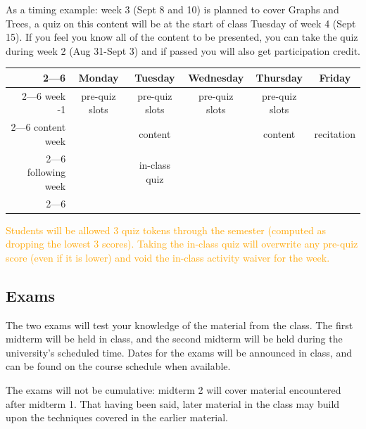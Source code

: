 \documentclass[12pt]{scrartcl}
\newcommand{\change}[2]{\textcolor{orange}{#2}}
\begin{document}
As a timing example: week 3 (Sept 8 and 10) is planned to cover Graphs and Trees, 
a quiz on this content will be at the start of class Tuesday of week 4 (Sept 15).
If you feel you know all of the content to be presented, you can take the quiz during week 2 (Aug 31-Sept 3) and if passed you will also get participation credit. 

\begin{tabular}{r|c|c|c|c|c|}
\cline{2---6}
&Monday & Tuesday & Wednesday & Thursday & Friday\\
\cline{2---6}\cline{2---6}
week -1 & pre-quiz slots & pre-quiz slots & pre-quiz slots & pre-quiz slots & \\
\cline{2---6}
content week & & content & & content & recitation\\
\cline{2---6}
 following week &  & in-class quiz & & & \\
\cline{2---6}

\end{tabular}
 
 \change{}{Students will be allowed 3 quiz tokens through the semester (computed as dropping the lowest 3 scores).
 Taking the in-class quiz will overwrite any pre-quiz score (even if it is lower) and void the in-class activity waiver for the week. }

\subsection{Exams}
The two exams will test your knowledge of the material from the class. 
The first midterm will be held in class, and the second midterm will be held during the university’s scheduled time. 
Dates for the exams will be announced in class, and can be found on the course schedule when available.

The exams will not be cumulative: midterm 2 will cover material encountered after midterm 1. 
That having been said, later material in the class may build upon the techniques covered in the earlier material.







\end{document}
